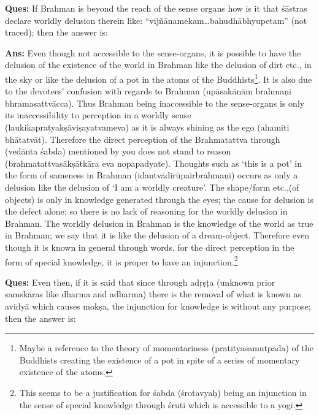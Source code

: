\textbf{Ques:} If Brahman is beyond the reach of the sense organs how is it that śāstras declare worldly delusion therein like: “vijñānamekam…bahu\-dhābhyupetam” (not traced); then the answer is:

\textbf{Ans:} Even though not accessible to the sense-organs, it is possible to have the delusion of the existence of the world in Brahman like the delusion of dirt etc., in the sky or like the delusion of a pot in the atoms of the Buddhists\footnote{Maybe a reference to the theory of momentariness (pratītyasamutpāda) of the Buddhists creating the existence of a pot in spite of a series of momentary existence of the atoms.}. It is also due to the devotees’ confusion with regards to Brahman (upāsakānām brahmaṇi bhramasattvācca). Thus Brahman being inaccessible to the sense-organs is only its inaccessibility to perception in a worldly sense (laukikapratyakṣāviṣayatvameva) as it is always shining as the ego (ahamiti bhātatvāt). Therefore the direct perception of the Brahmatattva through (vedānta śabda) mentioned by you does not stand to reason (brahmatattvasākṣātkāra eva nopapadyate). Thoughts such as ‘this is a pot’ in the form of sameness in Brahman (idantvādirūpairbrahmaṇi) occurs as only a delusion like the delusion of ‘I am a worldly creature’. The shape/form etc.,(of objects) is only in knowledge generated through the eyes; the cause for delusion is the defect alone; so there is no lack of reasoning for the worldly delusion in Brahman. The worldly delusion in Brahman is the knowledge of the world as true in Brahman; we say that it is like the delusion of a dream-object. Therefore even though it is known in general through words, for the direct perception in the form of special knowledge, it is proper to have an injunction.\footnote{This seems to be a justification for śabda (śrotavyaḥ) being an injunction in the sense of special knowledge through śruti which is accessible to a yogī.}

\vskip -3pt

\textbf{Ques:} Even then, if it is said that since through adṛṣṭa (unknown prior samskāras like dharma and adharma) there is the removal of what is known as avidyā which causes mokṣa, the injunction for knowledge is without any purpose; then the answer is:

\vskip -3pt

